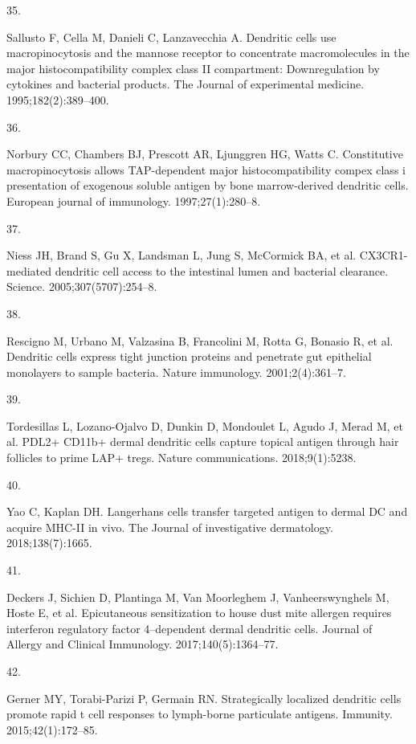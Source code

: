 \documentclass[
]{article}
\newlength{\cslhangindent}
\newlength{\csllabelwidth}
\newenvironment{CSLReferences}[2] %
 {\begin{list}{}{%
  \setlength{\itemindent}{0pt}
  \setlength{\leftmargin}{0pt}
  \setlength{\parsep}{0pt}
  \ifodd #1
   \setlength{\leftmargin}{\cslhangindent}
   \setlength{\itemindent}{-1\cslhangindent}
  \fi
  \setlength{\itemsep}{#2\baselineskip}}}
 {\end{list}}
\newcommand{\CSLLeftMargin}[1]{\parbox[t]{\csllabelwidth}{\strut#1\strut}}
\newcommand{\CSLRightInline}[1]{\parbox[t]{\linewidth - \csllabelwidth}{\strut#1\strut}}
\begin{document}
\begin{CSLReferences}{0}{1}
\CSLLeftMargin{35. }%
\CSLRightInline{Sallusto F, Cella M, Danieli C, Lanzavecchia A.
Dendritic cells use macropinocytosis and the mannose receptor to
concentrate macromolecules in the major histocompatibility complex class
II compartment: Downregulation by cytokines and bacterial products. The
Journal of experimental medicine. 1995;182(2):389--400. }

\CSLLeftMargin{36. }%
\CSLRightInline{Norbury CC, Chambers BJ, Prescott AR, Ljunggren HG,
Watts C. Constitutive macropinocytosis allows TAP-dependent major
histocompatibility compex class i presentation of exogenous soluble
antigen by bone marrow-derived dendritic cells. European journal of
immunology. 1997;27(1):280--8. }

\CSLLeftMargin{37. }%
\CSLRightInline{Niess JH, Brand S, Gu X, Landsman L, Jung S, McCormick
BA, et al. CX3CR1-mediated dendritic cell access to the intestinal lumen
and bacterial clearance. Science. 2005;307(5707):254--8. }

\CSLLeftMargin{38. }%
\CSLRightInline{Rescigno M, Urbano M, Valzasina B, Francolini M, Rotta
G, Bonasio R, et al. Dendritic cells express tight junction proteins and
penetrate gut epithelial monolayers to sample bacteria. Nature
immunology. 2001;2(4):361--7. }

\CSLLeftMargin{39. }%
\CSLRightInline{Tordesillas L, Lozano-Ojalvo D, Dunkin D, Mondoulet L,
Agudo J, Merad M, et al. PDL2+ CD11b+ dermal dendritic cells capture
topical antigen through hair follicles to prime LAP+ tregs. Nature
communications. 2018;9(1):5238. }

\CSLLeftMargin{40. }%
\CSLRightInline{Yao C, Kaplan DH. Langerhans cells transfer targeted
antigen to dermal DC and acquire MHC-II in vivo. The Journal of
investigative dermatology. 2018;138(7):1665. }

\CSLLeftMargin{41. }%
\CSLRightInline{Deckers J, Sichien D, Plantinga M, Van Moorleghem J,
Vanheerswynghels M, Hoste E, et al. Epicutaneous sensitization to house
dust mite allergen requires interferon regulatory factor 4--dependent
dermal dendritic cells. Journal of Allergy and Clinical Immunology.
2017;140(5):1364--77. }

\CSLLeftMargin{42. }%
\CSLRightInline{Gerner MY, Torabi-Parizi P, Germain RN. Strategically
localized dendritic cells promote rapid t cell responses to lymph-borne
particulate antigens. Immunity. 2015;42(1):172--85. }


\end{CSLReferences}
\end{document}
